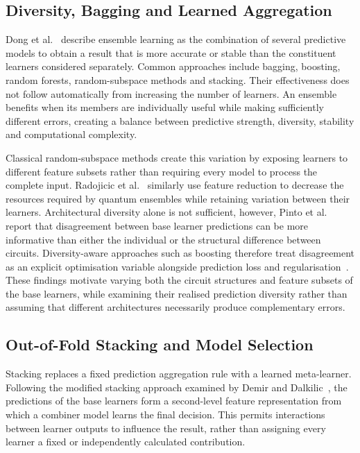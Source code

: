 \documentclass[]{UCD_CS_MSc_AAI_Report}
\begin{document}
\subsection{Diversity, Bagging and Learned Aggregation}
Dong et al.~\cite{dong_survey_2020} describe ensemble learning as the combination of several predictive models to obtain a result that is more accurate or stable than the constituent learners considered separately. Common approaches include \gls{bagging}, \gls{boosting}, random forests, random-subspace methods and stacking. Their effectiveness does not follow automatically from increasing the number of learners. An ensemble benefits when its members are individually useful while making sufficiently different errors, creating a balance between predictive strength, diversity, stability and computational complexity.

Classical random-subspace methods create this variation by exposing learners to different feature subsets rather than requiring every model to process the complete input. Radojicic et al.~\cite{radojicic_reducing_2026} similarly use feature reduction to decrease the resources required by quantum ensembles while retaining variation between their learners. Architectural diversity alone is not sufficient, however, Pinto et al.~\cite{pinto_composing_2026} report that disagreement between base learner predictions can be more informative than either the individual  or the structural difference between circuits. Diversity-aware approaches such as boosting therefore treat disagreement as an explicit optimisation variable alongside prediction loss and regularisation~\cite{liu_construction_2025}. These findings motivate varying both the circuit structures and feature subsets of the base learners, while examining their realised prediction diversity rather than assuming that different architectures necessarily produce complementary errors.

\subsection{Out-of-Fold Stacking and Model Selection}
Stacking replaces a fixed prediction aggregation rule with a learned \gls{meta-learner}. Following the modified stacking approach examined by Demir and Dalkilic~\cite{demir_modified_2018}, the predictions of the base learners form a second-level feature representation from which a combiner model learns the final decision. This permits interactions between learner outputs to influence the result, rather than assigning every learner a fixed or independently calculated contribution.
\end{document}
